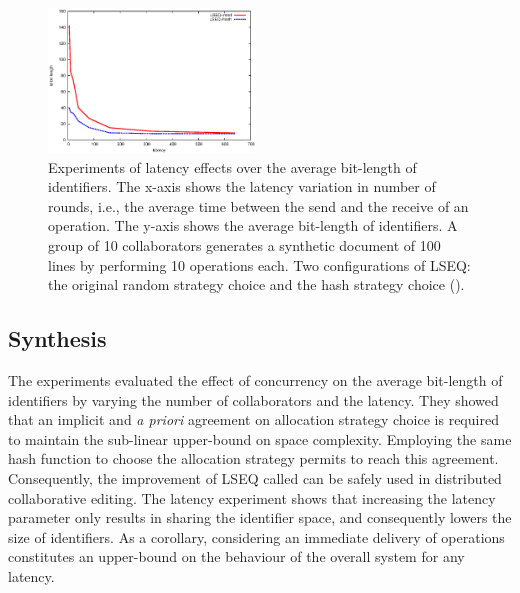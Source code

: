 \begin{figure}
\begin{center}
\includegraphics[width=0.49\textwidth]{img/stats.eps}
\caption{Experiments of latency effects over the average bit-length of
  identifiers. The x-axis shows the latency variation in number of rounds,
  i.e., the average time between the send and the receive of an operation. The
  y-axis shows the average bit-length of identifiers. A group of 10
  collaborators generates a synthetic document of 100 lines by performing 10
  operations each. Two configurations of LSEQ: the original random strategy
  choice and the hash strategy choice (\NAME{}).}
\label{im:stats}
\end{center}
\end{figure}

\subsection{Synthesis}
The experiments evaluated the effect of concurrency on the average bit-length
of identifiers by varying the number of collaborators and the latency. They
showed that an implicit and \emph{a priori} agreement on allocation strategy
choice is required to maintain the sub-linear upper-bound on space
complexity. Employing the same hash function to choose the allocation strategy
permits to reach this agreement. Consequently, the improvement of LSEQ called
\NAME{} can be safely used in distributed collaborative editing. The latency
experiment shows that increasing the latency parameter only results in sharing
the identifier space, and consequently lowers the size of identifiers. As a
corollary, considering an immediate delivery of operations constitutes an
upper-bound on the behaviour of the overall system for any latency.

